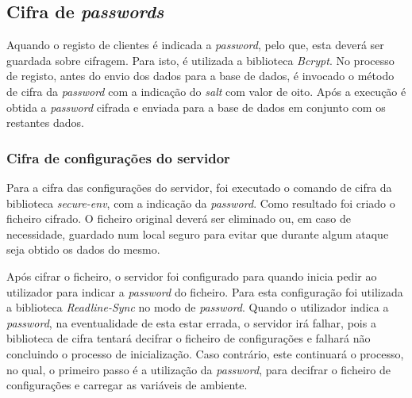 \subsection{Cifra de \textit{passwords}}
Aquando o registo de clientes é indicada a \textit{password}, pelo que, esta deverá ser guardada sobre cifragem. Para isto, é utilizada a biblioteca \textit{Bcrypt}. No processo de registo, antes do envio dos dados para a base de dados, é invocado o método de cifra da \textit{password} com a indicação do \textit{salt} com valor de oito. Após a execução é obtida a \textit{password} cifrada e enviada para a base de dados em conjunto com os restantes dados.

\subsubsection{Cifra de configurações do servidor}
Para a cifra das configurações do servidor, foi executado o comando de cifra da biblioteca \textit{secure-env}, com a indicação da \textit{password}. Como resultado foi criado o ficheiro cifrado. O ficheiro original deverá ser eliminado ou, em caso de necessidade, guardado num local seguro para evitar que durante algum ataque seja obtido os dados do mesmo.

Após cifrar o ficheiro, o servidor foi configurado para quando inicia pedir ao utilizador para indicar a \textit{password} do ficheiro. Para esta configuração foi utilizada a biblioteca \textit{Readline-Sync} no modo de \textit{password}. Quando o utilizador indica a \textit{password}, na eventualidade de esta estar errada, o servidor irá falhar, pois a biblioteca de cifra tentará decifrar o ficheiro de configurações e falhará não concluindo o processo de inicialização. Caso contrário, este continuará o processo, no qual, o primeiro passo é a utilização da \textit{password}, para decifrar o ficheiro de configurações e carregar as variáveis de ambiente.